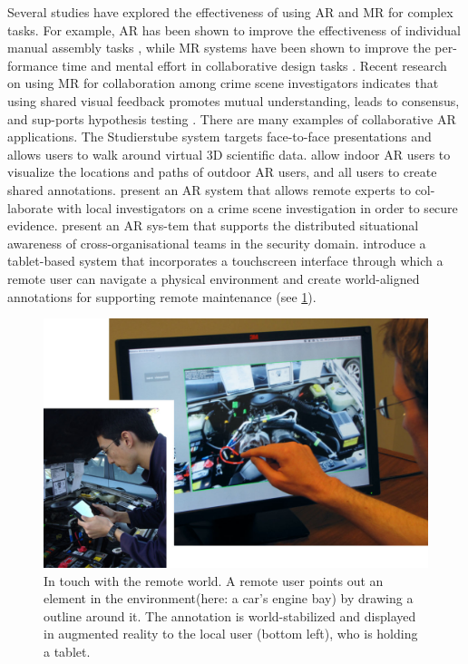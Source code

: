 Several studies have explored the effectiveness of using AR and MR for complex tasks. For example, AR has been shown to improve the effectiveness of individual manual assembly tasks \cite{Baird1999}, while MR systems have been shown to improve the per-formance time and mental effort in collaborative design tasks \cite{Wang2011}. Recent research on using MR for collaboration among crime scene investigators indicates that using shared visual feedback promotes mutual understanding, leads to consensus, and sup-ports hypothesis testing \cite{Poelman2012}.    There are many examples of collaborative AR applications. The Studierstube system \cite{Szalavri1998} targets face-to-face presentations and allows users to walk around virtual 3D scientific data. \citet{Hollerer1999} allow indoor AR users to visualize the locations and paths of outdoor AR users, and all users to create shared annotations.\citet{Poelman2012} present an AR system that allows remote experts to col-laborate with local investigators on a crime scene investigation in order to secure evidence. \citet{Datcu2014} present an AR sys-tem that supports the distributed situational awareness of cross-organisational teams in the security domain. \citet{Gauglitz2014} introduce a tablet-based system that incorporates a touchscreen interface through which a remote user can navigate a physical environment and create world-aligned annotations for supporting remote maintenance (see \figurename{\ref{fig:2-bg:drawingsandvirtualnavigation}}). 
\begin{figure}
\centering
\includegraphics[width=0.8\linewidth]{"figures/2-bg/drawings and virtual navigation"}
\caption{In touch with the remote world. A remote user points out an element in the environment(here: a car's engine bay) by drawing a outline around it. The annotation is world-stabilized and displayed in augmented reality to the local user (bottom left), who is holding a tablet.}
\label{fig:2-bg:drawingsandvirtualnavigation}
\end{figure}

